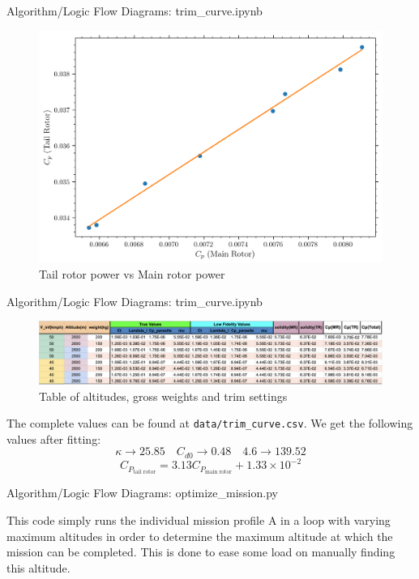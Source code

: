 \documentclass{beamer}
\begin{document}
\begin{frame}{Algorithm/Logic Flow Diagrams: trim\_curve.ipynb}
  \begin{figure}[h!]
    \centering
    \includegraphics[width=0.8\linewidth]{../images/cp_tail_rotor_vs_cp_main_rotor.png}
    \caption{Tail rotor power vs Main rotor power}
  \end{figure}
\end{frame}

\begin{frame}{Algorithm/Logic Flow Diagrams: trim\_curve.ipynb}
  \begin{figure}[h!]
    \centering
    \includegraphics[width=\linewidth]{../images/trim_table.png}
    \caption{Table of altitudes, gross weights and trim settings}
  \end{figure}
  The complete values can be found at \texttt{data/trim\_curve.csv}.
  We get the following values after fitting:
  \[
    \kappa \rightarrow 25.85 \quad C_{d0} \rightarrow 0.48 \quad 4.6 \rightarrow 139.52
  \]
  \[
    C_{P_\text{tail rotor}} = 3.13 C_{P_\text{main rotor}} + 1.33 \times 10^{-2}
  \]
\end{frame}

  \begin{frame}{Algorithm/Logic Flow Diagrams: optimize\_mission.py}

    This code simply runs the individual mission profile A in a loop with varying maximum altitudes in order to determine the maximum altitude at which the mission can be completed. This is done to ease some load on manually finding this altitude.

  \end{frame}
\end{document}

